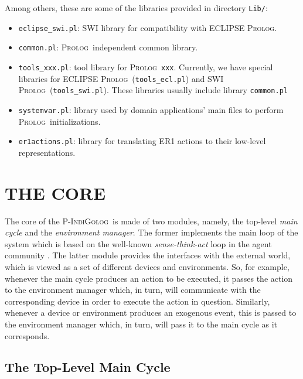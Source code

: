\documentclass[11pt]{article}
\newcommand{\PIndiGolog}{\mbox{\textsc{P-IndiGolog}}}
\newcommand{\Prolog}{\mbox{\textsc{Prolog}}}
\begin{document}
Among others, these are some of the libraries provided in directory
\texttt{Lib/}:
\begin{itemize}
\item \texttt{eclipse\_swi.pl}: SWI library for compatibility with ECLIPSE
\Prolog.

\item \texttt{common.pl}: \Prolog\ independent common library.

\item \texttt{tools\_xxx.pl}: tool library for \Prolog\ \texttt{xxx}. Currently,
we have special libraries for ECLIPSE \Prolog\ (\texttt{tools\_ecl.pl}) and
SWI \Prolog\ (\texttt{tools\_swi.pl}). These libraries usually include library
\texttt{common.pl}


\item \texttt{systemvar.pl}: library used by domain applications' main
files to perform \Prolog\ initializations.

\item \texttt{er1actions.pl}: library for translating ER1 actions to their
low-level representations.
\end{itemize} 



\section{THE CORE \label{sec:main}}

The core of the \PIndiGolog\ is made of two modules, namely, the top-level
\emph{main cycle} and the \emph{environment manager}.
%
The former implements the main loop of the system which is based on the
well-known \textit{sense-think-act} loop in the agent community
\cite{Kowalski95}.
%
The latter module provides the interfaces with the external world, which is
viewed as a set of different devices and environments. 
%
So, for example, whenever the main cycle produces an action to be executed, it
passes the action to the environment manager which, in turn, will communicate
with the corresponding device in order to execute the action in question.
Similarly, whenever a device or environment produces an exogenous event, this
is passed to the environment manager which, in turn, will pass it to the main
cycle as it corresponds.


\subsection{The Top-Level Main Cycle \label{sec:maincycle} }
\end{document}
